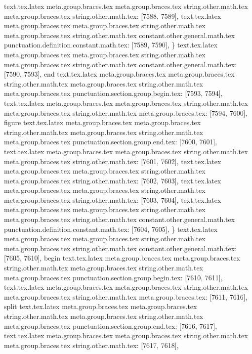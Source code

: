 {{{{{{{{{{{{{{{{{{{{{{{{{{{{{{{{{{{{{{{{{{{{{{{{{{{{{{{{{{{{{{{{{{{{{{{{{{{{{{{{{{{{{{{{{{{{{{{{{{{{{{{{{{{{{{{{{{{{{{{{{{{{{{{{{{{{{{{{{{{{{{{{{{{{{{{{{{{{{{{{{{{{{{{{{{{{{{{{{{{{{{{{{{{{{{{{{{{{{{{{{{{{{{{{text.tex.latex meta.group.braces.tex meta.group.braces.tex string.other.math.tex meta.group.braces.tex string.other.math.tex: [7588, 7589], {
}
text.tex.latex meta.group.braces.tex meta.group.braces.tex string.other.math.tex meta.group.braces.tex string.other.math.tex constant.other.general.math.tex punctuation.definition.constant.math.tex: [7589, 7590], {\}
text.tex.latex meta.group.braces.tex meta.group.braces.tex string.other.math.tex meta.group.braces.tex string.other.math.tex constant.other.general.math.tex: [7590, 7593], {end}
text.tex.latex meta.group.braces.tex meta.group.braces.tex string.other.math.tex meta.group.braces.tex string.other.math.tex meta.group.braces.tex punctuation.section.group.begin.tex: [7593, 7594], {{}
text.tex.latex meta.group.braces.tex meta.group.braces.tex string.other.math.tex meta.group.braces.tex string.other.math.tex meta.group.braces.tex: [7594, 7600], {figure}
text.tex.latex meta.group.braces.tex meta.group.braces.tex string.other.math.tex meta.group.braces.tex string.other.math.tex meta.group.braces.tex punctuation.section.group.end.tex: [7600, 7601], {}}
text.tex.latex meta.group.braces.tex meta.group.braces.tex string.other.math.tex meta.group.braces.tex string.other.math.tex: [7601, 7602], {
}
text.tex.latex meta.group.braces.tex meta.group.braces.tex string.other.math.tex meta.group.braces.tex string.other.math.tex: [7602, 7603], {
}
text.tex.latex meta.group.braces.tex meta.group.braces.tex string.other.math.tex meta.group.braces.tex string.other.math.tex: [7603, 7604], {
}
text.tex.latex meta.group.braces.tex meta.group.braces.tex string.other.math.tex meta.group.braces.tex string.other.math.tex constant.other.general.math.tex punctuation.definition.constant.math.tex: [7604, 7605], {\}
text.tex.latex meta.group.braces.tex meta.group.braces.tex string.other.math.tex meta.group.braces.tex string.other.math.tex constant.other.general.math.tex: [7605, 7610], {begin}
text.tex.latex meta.group.braces.tex meta.group.braces.tex string.other.math.tex meta.group.braces.tex string.other.math.tex meta.group.braces.tex punctuation.section.group.begin.tex: [7610, 7611], {{}
text.tex.latex meta.group.braces.tex meta.group.braces.tex string.other.math.tex meta.group.braces.tex string.other.math.tex meta.group.braces.tex: [7611, 7616], {split}
text.tex.latex meta.group.braces.tex meta.group.braces.tex string.other.math.tex meta.group.braces.tex string.other.math.tex meta.group.braces.tex punctuation.section.group.end.tex: [7616, 7617], {}}
text.tex.latex meta.group.braces.tex meta.group.braces.tex string.other.math.tex meta.group.braces.tex string.other.math.tex: [7617, 7618], {
}}}}}}}}}}}}}}}}}}}}}}}}}}}}}}}}}}}}}}}}}}}}}}}}}}}}}}}}}}}}}}}}}}}}}}}}}}}}}}}}}}}}}}}}}}}}}}}}}}}}}}}}}}}}}}}}}}}}}}}}}}}}}}}}}}}}}}}}}}}}}}}}}}}}}}}}}}}}}}}}}}}}}}}}}}}}}}}}}}}}}}}}}}}}}}}}}}}}}}}}}}}}}}}}}}}
